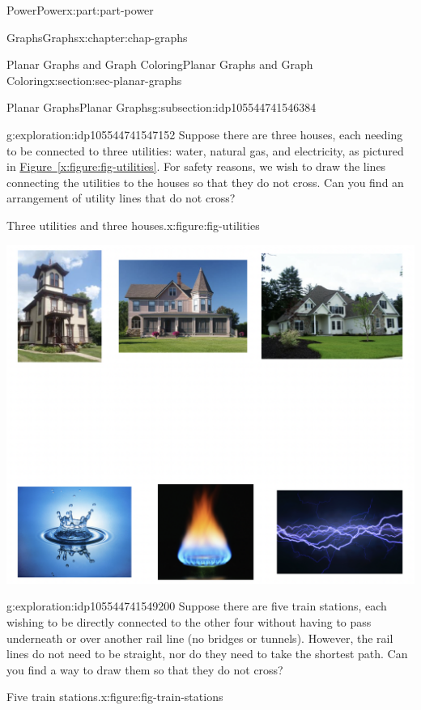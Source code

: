 \documentclass[oneside,10pt,]{book}
\newcommand{\xreffont}{\relax}
\numberwithin{equation}{section}
\begin{document}
\begin{partptx}{Power}{}{Power}{}{}{x:part:part-power}
\begin{chapterptx}{Graphs}{}{Graphs}{}{}{x:chapter:chap-graphs}
\begin{sectionptx}{Planar Graphs and Graph Coloring}{}{Planar Graphs and Graph Coloring}{}{}{x:section:sec-planar-graphs}
%
\begin{subsectionptx}{Planar Graphs}{}{Planar Graphs}{}{}{g:subsection:idp105544741546384}
\begin{exploration}{}{g:exploration:idp105544741547152}%
Suppose there are three houses, each needing to be connected to three utilities: water, natural gas, and electricity, as pictured in \hyperref[x:figure:fig-utilities]{Figure~{\xreffont\ref{x:figure:fig-utilities}}}. For safety reasons, we wish to draw the lines connecting the utilities to the houses so that they do not cross. Can you find an arrangement of utility lines that do not cross?%
\begin{figureptx}{Three utilities and three houses.}{x:figure:fig-utilities}{}%
\begin{image}{0.25}{0.5}{0.25}%
\includegraphics[width=\linewidth]{./images/utilities.png}
\end{image}%
\tcblower
\end{figureptx}%
\end{exploration}%
\begin{exploration}{}{g:exploration:idp105544741549200}%
Suppose there are five train stations, each wishing to be directly connected to the other four without having to pass underneath or over another rail line (no bridges or tunnels). However, the rail lines do not need to be straight, nor do they need to take the shortest path. Can you find a way to draw them so that they do not cross?%
\begin{figureptx}{Five train stations.}{x:figure:fig-train-stations}{}%

\end{figureptx}
\end{exploration}
\end{subsectionptx}
\end{sectionptx}
\end{chapterptx}
\end{partptx}
\end{document}
